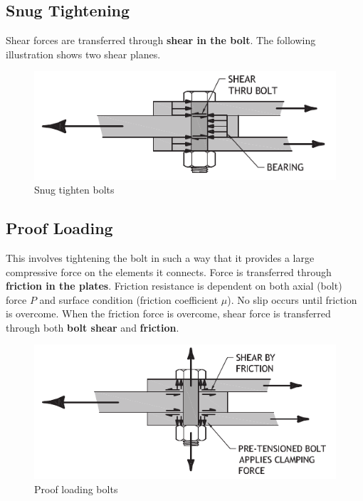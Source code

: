 \subsection{Snug Tightening}
Shear forces are transferred through \textbf{shear in the bolt}. The following illustration shows two shear planes.
\begin{figure}[H]
\centering
\includegraphics{PIC/CH06/STB}
\caption{Snug tighten bolts \citep{McMullin2018}}
\end{figure}
\subsection{Proof Loading}
This involves tightening the bolt in such a way that it provides a large compressive force on the elements it connects. Force is transferred through \textbf{friction in the plates}. Friction resistance is dependent on both axial (bolt) force $P$ and surface condition (friction coefficient $\mu$). No slip occurs until friction is overcome. When the friction force is overcome, shear force is transferred through both \textbf{bolt shear} and \textbf{friction}.
\begin{figure}[H]
\centering
\includegraphics{PIC/CH06/PLB}
\caption{Proof loading bolts \citep{McMullin2018}}
\end{figure}

